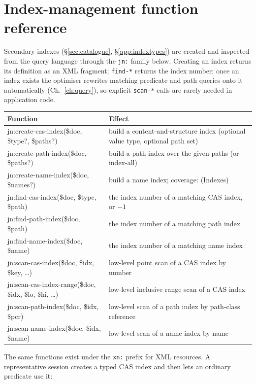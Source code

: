 \documentclass[11pt,a4paper,oneside]{report}
\theoremstyle{sirixthm}
\newcommand{\code}[1]{\texttt{#1}}
\begin{document}
\section{Index-management function reference}
\label{app:indexfuncs}

Secondary indexes (\S\ref{sec:catalogue}, \S\ref{app:indextypes}) are created and inspected from the
query language through the \code{jn:} family below. Creating an index returns its definition as an XML fragment;
\code{find-*} returns the index number; once an index exists the optimiser rewrites matching predicate
and path queries onto it automatically (Ch.~\ref{ch:query}), so explicit \code{scan-*} calls are rarely
needed in application code.

{\small
\begin{xltabular}{\linewidth}{@{}>{\ttfamily\footnotesize}p{0.46\textwidth} >{\RaggedRight\arraybackslash}X@{}}
\toprule
\textnormal{\textbf{Function}} & \textbf{Effect}\\
\midrule
\endhead
jn:create-cas-index(\$doc, \$type?, \$paths?) & build a content-and-structure index (optional value type, optional path set)\\
jn:create-path-index(\$doc, \$paths?) & build a path index over the given paths (or index-all)\\
jn:create-name-index(\$doc, \$names?) & build a name index; coverage:  (Indexes)\\
jn:find-cas-index(\$doc, \$type, \$path) & the index number of a matching CAS index, or $-1$\\
jn:find-path-index(\$doc, \$path) & the index number of a matching path index\\
jn:find-name-index(\$doc, \$name) & the index number of a matching name index\\
jn:scan-cas-index(\$doc, \$idx, \$key, \ldots) & low-level point scan of a CAS index by number\\
jn:scan-cas-index-range(\$doc, \$idx, \$lo, \$hi, \ldots) & low-level inclusive range scan of a CAS index\\
jn:scan-path-index(\$doc, \$idx, \$pcr) & low-level scan of a path index by path-class reference\\
jn:scan-name-index(\$doc, \$idx, \$name) & low-level scan of a name index by name\\
\bottomrule
\end{xltabular}}

\noindent The same functions exist under the \code{xn:} prefix for XML resources. A representative
session creates a typed CAS index and then lets an ordinary predicate use it:
\end{document}
